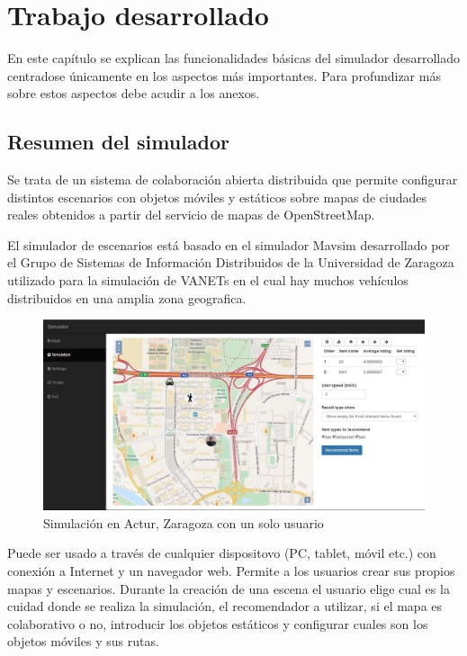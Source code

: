 \chapter{Trabajo desarrollado}


En este capítulo se explican las funcionalidades básicas del simulador desarrollado centradose únicamente en los aspectos más importantes. Para profundizar más sobre estos aspectos debe acudir a los anexos.

\section{Resumen del simulador}


Se trata de un sistema de colaboración abierta distribuida que permite configurar distintos escenarios con objetos móviles y estáticos sobre mapas de ciudades reales obtenidos a partir del servicio de mapas de OpenStreetMap. 

El simulador de escenarios está basado en el simulador Mavsim desarrollado por el Grupo de Sistemas de Información Distribuidos de la Universidad de Zaragoza utilizado para la simulación de VANETs en el cual hay muchos vehículos distribuidos en una amplia zona geografica.

\begin{figure}[H]
\centering\includegraphics[scale=0.3]{imagenes/resumen-simulador.jpg}
\caption{Simulación en Actur, Zaragoza con un solo usuario}
\label{c2_trama}
\end{figure}

Puede ser usado a través de cualquier dispositovo (PC, tablet, móvil etc.) con conexión a Internet y un navegador web. Permite a los usuarios crear sus propios mapas y escenarios. Durante la creación de una escena el usuario elige cual es la cuidad donde se realiza la simulación, el recomendador a utilizar, si el mapa es colaborativo o no, introducir los objetos estáticos y configurar cuales son los objetos móviles y sus rutas. 

